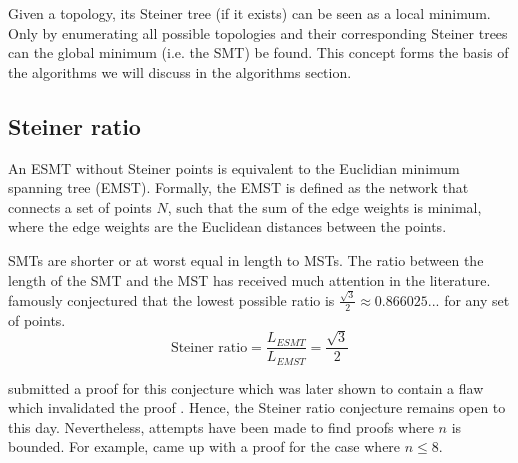\documentclass{l4proj}
\begin{document}
Given a topology, its Steiner tree (if it exists) can be seen as a local minimum. Only by enumerating all possible topologies and their corresponding Steiner trees can the global minimum (i.e. the SMT) be found. This concept forms the basis of the algorithms we will discuss in the algorithms section.

\subsection{Steiner ratio}
\label{sec:esmt_steiner_ratio}
An ESMT without Steiner points is equivalent to the Euclidian minimum spanning tree (EMST). Formally, the EMST is defined as the network that connects a set of points $N$, such that the sum of the edge weights is minimal, where the edge weights are the Euclidean distances between the points.

SMTs are shorter or at worst equal in length to MSTs. The ratio between the length of the SMT and the MST has received much attention in the literature. \cite{Gilbert1968SteinerMT} famously conjectured that the lowest possible ratio is $\frac{\sqrt{3}}{2} \approx 0.866025...$ for any set of points.
$$
    \text{Steiner ratio} = \frac{L_{ESMT}}{L_{EMST}} = \frac{\sqrt{3}}{2}
$$

\cite{Steiner_ratio_proof} submitted a proof for this conjecture which was later shown to contain a flaw which invalidated the proof \citep{Steiner_ratio_proof_invalidated}. Hence, the Steiner ratio conjecture remains open to this day.
Nevertheless, attempts have been made to find proofs where $n$ is bounded. For example, \cite{Steiner_ratio_proof_8_points} came up with a proof for the case where $n \leq 8$.
\end{document}
